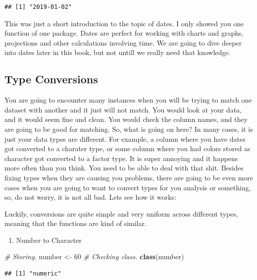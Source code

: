 \documentclass[]{book}
\newenvironment{Shaded}{\begin{snugshade}}{\end{snugshade}}
\newcommand{\CommentTok}[1]{\textcolor[rgb]{0.56,0.35,0.01}{\textit{#1}}}
\newcommand{\DecValTok}[1]{\textcolor[rgb]{0.00,0.00,0.81}{#1}}
\newcommand{\KeywordTok}[1]{\textcolor[rgb]{0.13,0.29,0.53}{\textbf{#1}}}
\newcommand{\NormalTok}[1]{#1}
\newcommand{\StringTok}[1]{\textcolor[rgb]{0.31,0.60,0.02}{#1}}
\providecommand{\tightlist}{%
  \setlength{\itemsep}{0pt}\setlength{\parskip}{0pt}}
\begin{document}
\begin{verbatim}
## [1] "2019-01-02"
\end{verbatim}

This was just a short introduction to the topic of dates. I only showed you one function of one package. Dates are perfect for working with charts and graphs, projections and other calculations involving time. We are going to dive deeper into dates later in this book, but not untill we really need that knowledge.

\hypertarget{type-conversions}{%
\subsection{Type Conversions}\label{type-conversions}}

You are going to encounter many instances when you will be trying to match one dataset with another and it just will not match. You would look at your data, and it would seem fine and clean. You would check the column names, and they are going to be good for matching. So, what is going on here? In many cases, it is just your data types are different. For example, a column where you have dates got converted to a charater type, or some column where you had colors stored as character got converted to a factor type. It is super annoying and it happens more often than you think. You need to be able to deal with that shit. Besides fixing types when they are causing you problems, there are going to be even more cases when you are going to want to convert types for you analysis or something, so, do not worry, it is not all bad. Lets see how it works:

Luckily, conversions are quite simple and very uniform across different types, meaning that the functions are kind of similar.

\begin{enumerate}
\def\labelenumi{\arabic{enumi}.}
\tightlist
\item
  Number to Character
\end{enumerate}

\begin{Shaded}
\begin{Highlighting}[]
\CommentTok{# Storing.}
\NormalTok{number <-}\StringTok{ }\DecValTok{60}
\CommentTok{# Checking class.}
\KeywordTok{class}\NormalTok{(number)}
\end{Highlighting}
\end{Shaded}

\begin{verbatim}
## [1] "numeric"
\end{verbatim}
\end{document}

